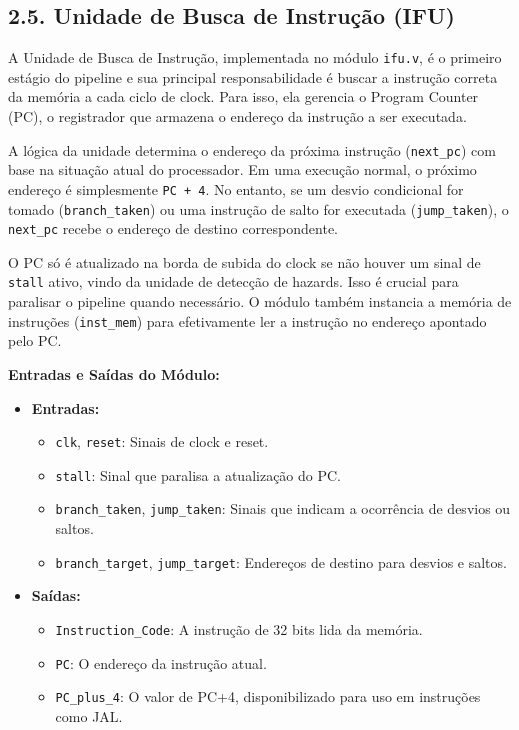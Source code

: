 \documentclass[12pt, a4paper]{article}
\begin{document}
\subsection*{2.5. Unidade de Busca de Instrução (IFU)}

A Unidade de Busca de Instrução, implementada no módulo \texttt{ifu.v}, é o primeiro estágio do pipeline e sua principal responsabilidade é buscar a instrução correta da memória a cada ciclo de clock. Para isso, ela gerencia o Program Counter (PC), o registrador que armazena o endereço da instrução a ser executada.

A lógica da unidade determina o endereço da próxima instrução (\texttt{next\_pc}) com base na situação atual do processador. Em uma execução normal, o próximo endereço é simplesmente \texttt{PC + 4}. No entanto, se um desvio condicional for tomado (\texttt{branch\_taken}) ou uma instrução de salto for executada (\texttt{jump\_taken}), o \texttt{next\_pc} recebe o endereço de destino correspondente.

O PC só é atualizado na borda de subida do clock se não houver um sinal de \texttt{stall} ativo, vindo da unidade de detecção de hazards. Isso é crucial para paralisar o pipeline quando necessário. O módulo também instancia a memória de instruções (\texttt{inst\_mem}) para efetivamente ler a instrução no endereço apontado pelo PC.

\vspace{0.5cm}
\textbf{Entradas e Saídas do Módulo:}
\begin{itemize}
    \item \textbf{Entradas:}
    \begin{itemize}
        \item \texttt{clk}, \texttt{reset}: Sinais de clock e reset.
        \item \texttt{stall}: Sinal que paralisa a atualização do PC.
        \item \texttt{branch\_taken}, \texttt{jump\_taken}: Sinais que indicam a ocorrência de desvios ou saltos.
        \item \texttt{branch\_target}, \texttt{jump\_target}: Endereços de destino para desvios e saltos.
    \end{itemize}
    \item \textbf{Saídas:}
    \begin{itemize}
        \item \texttt{Instruction\_Code}: A instrução de 32 bits lida da memória.
        \item \texttt{PC}: O endereço da instrução atual.
        \item \texttt{PC\_plus\_4}: O valor de PC+4, disponibilizado para uso em instruções como JAL.
    \end{itemize}
\end{itemize}
\end{document}
